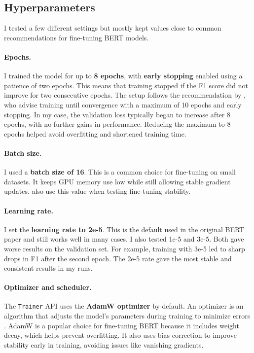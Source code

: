 \subsection{Hyperparameters}
    I tested a few different settings but mostly kept values close to common recommendations for fine-tuning BERT models.

    \paragraph{Epochs.} I trained the model for up to \textbf{8 epochs}, with \textbf{early stopping} enabled using a patience of two epochs. This means that training stopped if the F1 score did not improve for two consecutive epochs. The setup follows the recommendation by \citet{pecherComparingSpecialisedSmall2024}, who advise training until convergence with a maximum of 10 epochs and early stopping. In my case, the validation loss typically began to increase after 8 epochs, with no further gains in performance. Reducing the maximum to 8 epochs helped avoid overfitting and shortened training time.

    \paragraph{Batch size.} I used a \textbf{batch size of 16}. This is a common choice for fine-tuning on small datasets. It keeps GPU memory use low while still allowing stable gradient updates. \citet{mosbachStabilityFinetuningBERT2021} also use this value when testing fine-tuning stability.

    \paragraph{Learning rate.} I set the \textbf{learning rate to 2e-5}. This is the default used in the original BERT paper \citep{devlinBERTPretrainingDeep2019} and still works well in many cases. I also tested 1e-5 and 3e-5. Both gave worse results on the validation set. For example, training with 3e-5 led to sharp drops in F1 after the second epoch. The 2e-5 rate gave the most stable and consistent results in my runs.

    \paragraph{Optimizer and scheduler.} The \texttt{Trainer} API uses the \textbf{AdamW optimizer} by default. An optimizer is an algorithm that adjusts the model’s parameters during training to minimize errors \citep{mosbachStabilityFinetuningBERT2021}. AdamW is a popular choice for fine-tuning BERT because it includes weight decay, which helps prevent overfitting. It also uses bias correction to improve stability early in training, avoiding issues like vanishing gradients.

